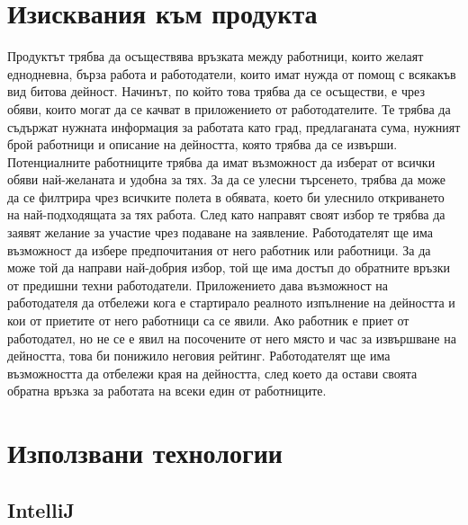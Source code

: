 \section{Изисквания към продукта}
Продуктът трябва да осъществява връзката между работници, които желаят еднодневна, бърза работа и работодатели, които имат нужда от помощ с всякакъв вид битова дейност. Начинът, по който това трябва да се осъществи, е чрез обяви, които могат да се качват в приложението от работодателите. Те трябва да съдържат нужната информация за работата като град, предлаганата сума, нужният брой работници и описание на дейността, която трябва да се извърши. Потенциалните работниците трябва да имат възможност да изберат от всички обяви най-желаната и удобна за тях. За да се улесни търсенето, трябва да може да се филтрира чрез всичките полета в обявата, което би улеснило откриването на най-подходящата за тях работа. След като направят своят избор те трябва да заявят желание за участие чрез подаване на заявление. Работодателят ще има възможност да избере предпочитания от него работник или работници. За да може той да направи най-добрия избор, той ще има достъп до обратните връзки от предишни техни работодатели. Приложението дава възможност на работодателя да отбележи кога е стартирало реалното изпълнение на дейността и кои от приетите от него работници са се явили. Ако работник е приет от работодател, но не се е явил на посочените от него място и час за извършване на дейността, това би понижило неговия рейтинг. Работодателят ще има възможността да отбележи края на дейността, след което да остави своята обратна връзка за работата на всеки един от работниците.

\section{Използвани технологии}

    \subsection{IntelliJ}
    
